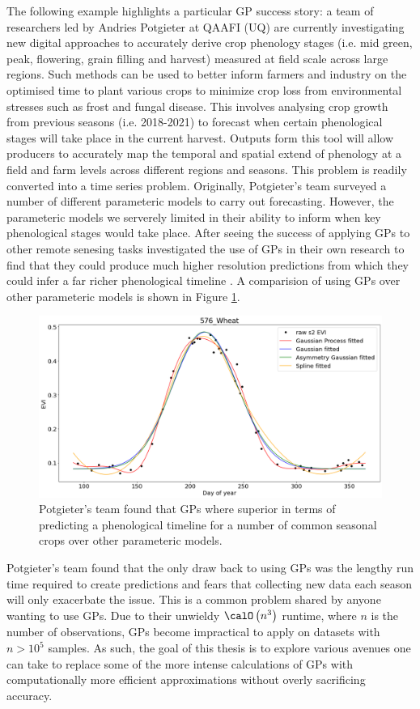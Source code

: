The following example highlights a particular GP success story: a team of researchers led by Andries Potgieter at QAAFI (UQ) are currently investigating new digital approaches to accurately derive crop phenology stages (i.e. mid green, peak, flowering, grain filling and harvest) measured at field scale across large regions. Such methods can be used to better inform farmers and industry on the optimised time to plant various crops to minimize crop loss from environmental stresses such as frost and fungal disease. This involves analysing crop growth from previous seasons (i.e. 2018-2021) to forecast when certain phenological stages will take place in the current harvest. Outputs form this tool will allow producers to accurately map the temporal and spatial extend of phenology at a field and farm levels across different regions and seasons. This problem is readily converted into a time series problem. Originally, Potgieter's team surveyed a number of different parameteric models to carry out forecasting. However, the parameteric models we serverely limited in their ability to inform when key phenological stages would take place. After seeing the success of applying GPs to other remote senesing tasks \cite{rs14010146} investigated the use of GPs in their own research to find that they could produce much higher resolution predictions from which they could infer a far richer phenological timeline \cite{potg2013}. A comparision of using GPs over other parameteric models is shown in Figure \ref{fig: GP_motivate_wheat}.
\begin{figure}[h]
    \centering
    \includegraphics[scale=0.3]{img/yan_wheat_GPR_plot.png}
    \caption{Potgieter's team found that GPs where superior in terms of predicting a phenological timeline for a number of common seasonal crops over other parameteric models.}
    \label{fig: GP_motivate_wheat}
\end{figure}
Potgieter's team found that the only draw back to using GPs was the lengthy run time required to create predictions and fears that collecting new data each season will only exacerbate the issue. This is a common problem shared by anyone wanting to use GPs. Due to their unwieldy $\calO \left( n^3 \right)$ runtime, where $n$ is the number of observations, GPs become impractical to apply on datasets with $n > 10^5$ samples. As such, the goal of this thesis is to explore various avenues one can take to replace some of the more intense calculations of GPs with computationally more efficient approximations without overly sacrificing accuracy.

